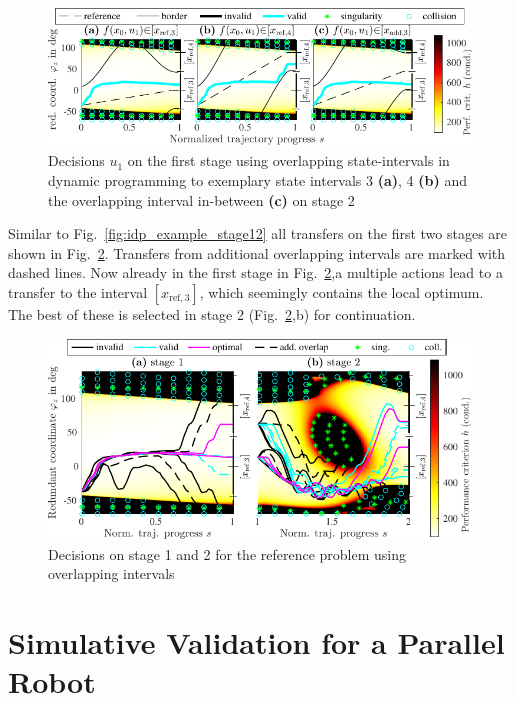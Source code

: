 \documentclass[runningheads]{llncs}
\begin{document}
\begin{figure}[ptb]
\centering
\includegraphics{dp_interv_overlap_stage1_3cases_compressed.pdf}
\caption{Decisions $u_1$ on the first stage using overlapping state-intervals in dynamic programming to exemplary state intervals 3 \textbf{(a)}, 4 \textbf{(b)} and the overlapping interval in-between \textbf{(c)} on stage 2}
\label{fig:idp_ol_example_stage1}
\end{figure}

Similar to Fig.~\ref{fig:idp_example_stage12} all transfers on the first two stages are shown in Fig.~\ref{fig:idp_ol_example_stage12}.
Transfers from additional overlapping intervals are marked with dashed lines.
Now already in the first stage in Fig.~\ref{fig:idp_ol_example_stage12},a multiple actions lead to a transfer to the interval $[x_{\mathrm{ref},3}]$, which seemingly contains the local optimum.
The best of these is selected in stage 2 (Fig.~\ref{fig:idp_ol_example_stage12},b) for continuation.

\begin{figure}[ptb]
	\centering
	\includegraphics{dp_interv_overlap_stage1_to_2_compressed.pdf}
	\caption{Decisions on stage 1 and 2 for the reference problem using overlapping intervals}
	\label{fig:idp_ol_example_stage12}
\end{figure}

\section{Simulative Validation for a Parallel Robot}
\label{sec:eval}
\end{document}
